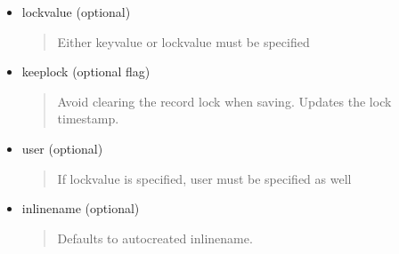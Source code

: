 \documentclass[letterpaper,10pt,english]{sphinxmanual}
\begin{document}
\begin{fulllineitems}
\begin{fulllineitems}
\begin{description}
\begin{itemize}
\item {} 
lockvalue (optional)
\begin{quote}

Either keyvalue or lockvalue must be specified
\end{quote}

\item {} 
keeplock (optional flag)
\begin{quote}

Avoid clearing the record lock when saving. Updates the lock timestamp.
\end{quote}

\item {} 
user (optional)
\begin{quote}

If lockvalue is specified, user must be specified as well
\end{quote}

\item {} 
inlinename (optional)
\begin{quote}

Defaults to autocreated inlinename.
\end{quote}

\end{itemize}

\end{description}

\end{fulllineitems}


\begin{fulllineitems}
\label{knop_database:knop_database.scrubKeywords}
\end{fulllineitems}


\begin{fulllineitems}
\end{fulllineitems}


\begin{fulllineitems}
\label{knop_database:knop_database.searchparams}
\end{fulllineitems}




\end{fulllineitems}
\end{document}
